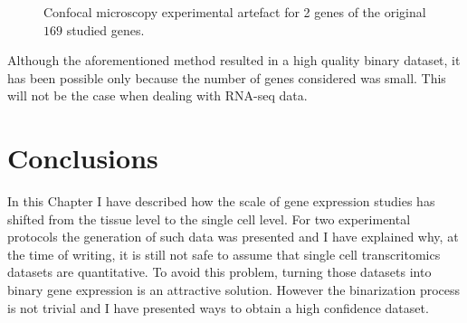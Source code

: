 \begin{figure}[h]
        \myfloatalign
         \quad
        \caption{Confocal microscopy experimental artefact for 2 genes of the original $169$ studied genes.}\label{fig:artefact}
\end{figure}
	
	Although the aforementioned method resulted in a high quality binary dataset, it has been possible only because the number of genes considered was small. This will not be the case when dealing with RNA-seq data.

\section{Conclusions}
In this Chapter I have described how the scale of gene expression studies has shifted from the tissue level to the single cell level. For two experimental protocols the generation of such data was presented and I have explained why, at the time of writing, it is still not safe to assume that single cell transcritomics datasets are quantitative. To avoid this problem, turning those datasets into binary gene expression is an attractive solution. However the binarization process is not trivial and I have presented ways to obtain a high confidence dataset.\\

